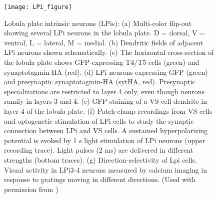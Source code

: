 
\begin{figure}
\centering
\hspace*{-1cm} 
\texttt{[image: LPi\_figure]}
\caption[Lobula plate intrinsic neurons (LPis)] {Lobula plate intrinsic neurons (LPis): (a) Multi-color flip-out showing several LPi neurons in the lobula plate. D = dorsal, V = ventral, L = lateral, M = medial. (b) Dendritic fields of adjacent LPi neurons shown schematically. (c) The horizontal cross-section of the lobula plate shows GFP-expressing T4/T5 cells (green) and synaptotagmin-HA (red). (d) LPi neurons expressing GFP (green) and presynaptic synaptotagmin-HA (sytHA, red). Presynaptic specializations are restricted to layer 4 only, even though neurons ramify in layers 3 and 4. (e) GFP staining of a VS cell dendrite in layer 4 of the lobula plate. (f) Patch-clamp recordings from VS cells and optogenetic stimulation of LPi cells to study the synaptic connection between LPi and VS cells. A sustained hyperpolarizing potential is evoked by 1 s light stimulation of LPi neurons (upper recording trace). Light pulses (2 ms) are delivered in different strengths (bottom traces). (g) Direction-selectivity of Lpi cells. Visual activity in LPi3-4 neurons measured by calcium imaging in response to gratings moving in different directions. (Used with permission from \parencite{Borst2020b})} 
\label{fig:lpifigure}
\end{figure}



